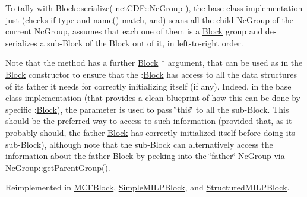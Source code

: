 To tally with Block\+::serialize( net\+C\+D\+F\+::\+Nc\+Group ), the base class implementation just (checks if type and \mbox{\hyperlink{class_s_m_spp__di__unipi__it_1_1_block_a738e9dfd6e00507da219e4bd5a3f6be9}{name()}} match, and) scans all the child Nc\+Group of the current Nc\+Group, assumes that each one of them is a \mbox{\hyperlink{class_s_m_spp__di__unipi__it_1_1_block}{Block}} group and de-\/serializes a sub-\/\+Block of the \mbox{\hyperlink{class_s_m_spp__di__unipi__it_1_1_block}{Block}} out of it, in left-\/to-\/right order.

Note that the method has a further \mbox{\hyperlink{class_s_m_spp__di__unipi__it_1_1_block}{Block}} $\ast$ argument, that can be used as in the \mbox{\hyperlink{class_s_m_spp__di__unipi__it_1_1_block}{Block}} constructor to ensure that the \+:\mbox{\hyperlink{class_s_m_spp__di__unipi__it_1_1_block}{Block}} has access to all the data structures of its father it needs for correctly initializing itself (if any). Indeed, in the base class implementation (that provides a clean blueprint of how this can be done by specific \+:\mbox{\hyperlink{class_s_m_spp__di__unipi__it_1_1_block}{Block}}), the parameter is used to pass \char`\"{}this\char`\"{} to all the sub-\/\+Block. This should be the preferred way to access to such information (provided that, as it probably should, the father \mbox{\hyperlink{class_s_m_spp__di__unipi__it_1_1_block}{Block}} has correctly initialized itself before doing its sub-\/\+Block), although note that the sub-\/\+Block can alternatively access the information about the father \mbox{\hyperlink{class_s_m_spp__di__unipi__it_1_1_block}{Block}} by peeking into the \char`\"{}father\char`\"{} Nc\+Group via Nc\+Group\+::get\+Parent\+Group(). 

Reimplemented in \mbox{\hyperlink{class_s_m_spp__di__unipi__it_1_1_m_c_f_block_a817e3ce47ea40c14517ec16c6b62b814}{M\+C\+F\+Block}}, \mbox{\hyperlink{class_s_m_spp__di__unipi__it_1_1_simple_m_i_l_p_block_a817e3ce47ea40c14517ec16c6b62b814}{Simple\+M\+I\+L\+P\+Block}}, and \mbox{\hyperlink{class_s_m_spp__di__unipi__it_1_1_structured_m_i_l_p_block_a817e3ce47ea40c14517ec16c6b62b814}{Structured\+M\+I\+L\+P\+Block}}.

\mbox{\label{class_s_m_spp__di__unipi__it_1_1_block_aca05cf94fb99b94e53cda94695f54551}} 

